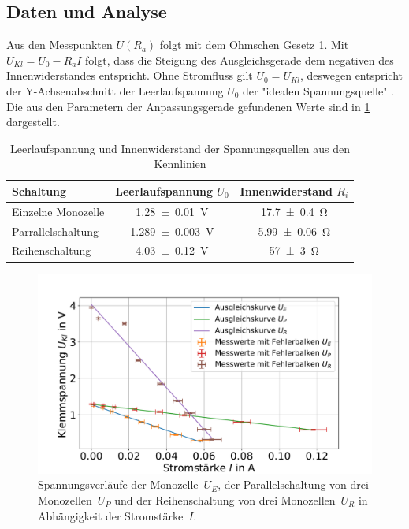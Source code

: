 \subsection{Daten und Analyse}


Aus den Messpunkten $U(R_a)$ folgt mit dem Ohmschen Gesetz \cref{fig:batt-ges-u}. Mit $U_{Kl}=U_0-R_a I$ folgt, dass die Steigung des Ausgleichsgerade dem negativen des Innenwiderstandes entspricht. Ohne Stromfluss gilt $U_0=U_{Kl}$, deswegen entspricht der Y-Achsenabschnitt der Leerlaufspannung $U_0$ der "idealen Spannungsquelle" \cite{lw}. Die aus den Parametern der Anpassungsgerade gefundenen Werte sind in \cref{tab:batt-U-R} dargestellt.





\begin{table}
	\caption{Leerlaufspannung und Innenwiderstand der Spannungsquellen aus den Kennlinien}
	\centering
	\begin{tabular}{|l||c|c|}
		\hline 
		Schaltung 	& Leerlaufspannung $U_0$ & Innenwiderstand $R_i$ \\ 
		\hline \hline
		Einzelne Monozelle	& \SI{1.28+-0.01}{V}  & \SI{17.7+-0.4}{\ohm } \\ 
		\hline  
		Parrallelschaltung	& \SI{1.289+-0.003}{V } &\SI{5.99+-0.06}{\ohm }  \\ 
		\hline   
		Reihenschaltung	& \SI{4.03+-0.12}{V } &\SI{57+-3}{\ohm }  \\ 
		\hline 
	\end{tabular} 
	
	\label{tab:batt-U-R}
	
\end{table}


 


\begin{figure}[h]
	\centering
	\includegraphics[width=0.9\linewidth]{"auswertung/Auswertung Innenwiderstand/Batterie Gesamt U"}
	\caption{Spannungsverläufe der Monozelle~$U_E$, der Parallelschaltung von drei Monozellen~$U_P$ und der Reihenschaltung von drei Monozellen~$U_R$ in Abhängigkeit der Stromstärke~$I$.}
	\label{fig:batt-ges-u}
\end{figure}










